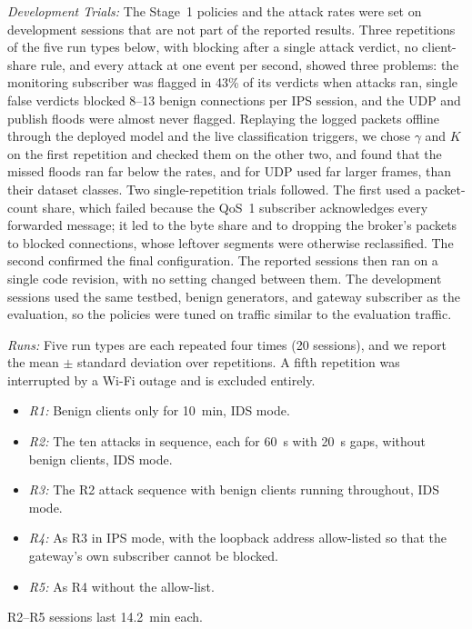 \documentclass[journal]{IEEEtran}
\begin{document}
\textit{Development Trials:} The Stage~1 policies and the attack rates were set on development sessions that are not part of the reported results. Three repetitions of the five run types below, with blocking after a single attack verdict, no client-share rule, and every attack at one event per second, showed three problems: the monitoring subscriber was flagged in 43\% of its verdicts when attacks ran, single false verdicts blocked 8--13 benign connections per IPS session, and the UDP and publish floods were almost never flagged. Replaying the logged packets offline through the deployed model and the live classification triggers, we chose $\gamma$ and $K$ on the first repetition and checked them on the other two, and found that the missed floods ran far below the rates, and for UDP used far larger frames, than their dataset classes. Two single-repetition trials followed. The first used a packet-count share, which failed because the QoS~1 subscriber acknowledges every forwarded message; it led to the byte share and to dropping the broker's packets to blocked connections, whose leftover segments were otherwise reclassified. The second confirmed the final configuration. The reported sessions then ran on a single code revision, with no setting changed between them. The development sessions used the same testbed, benign generators, and gateway subscriber as the evaluation, so the policies were tuned on traffic similar to the evaluation traffic.

\textit{Runs:} Five run types are each repeated four times (20 sessions), and we report the mean $\pm$ standard deviation over repetitions. A fifth repetition was interrupted by a Wi-Fi outage and is excluded entirely.
\begin{itemize}
  \item \textit{R1:} Benign clients only for 10~min, IDS mode.
  \item \textit{R2:} The ten attacks in sequence, each for 60~s with 20~s gaps, without benign clients, IDS mode.
  \item \textit{R3:} The R2 attack sequence with benign clients running throughout, IDS mode.
  \item \textit{R4:} As R3 in IPS mode, with the loopback address allow-listed so that the gateway's own subscriber cannot be blocked.
  \item \textit{R5:} As R4 without the allow-list.
\end{itemize}
R2--R5 sessions last 14.2~min each.
\end{document}
